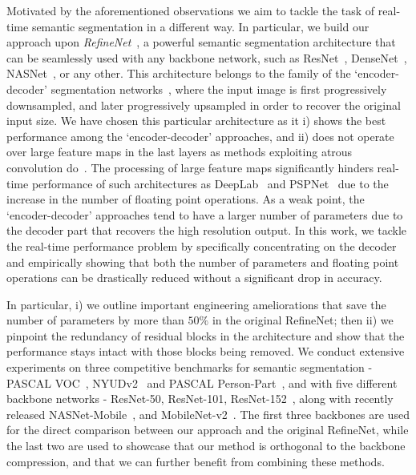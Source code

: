 \documentclass{bmvc2k}
\begin{document}
	Motivated by the aforementioned observations we aim to tackle the task of real-time semantic segmentation in a different way. In particular, we build our approach upon \textit{RefineNet}~\cite{LinMSR17}, a powerful semantic segmentation architecture that can be seamlessly used with any backbone network, such as ResNet~\cite{HeZRS16}, DenseNet~\cite{HuangLMW17}, NASNet~\cite{ZophVSL17}, or any other. This architecture belongs to the family of the `encoder-decoder' segmentation networks~\cite{PaszkeCKC16,BadrinarayananH15,NohHH15}, where the input image is first progressively downsampled, and later progressively upsampled in order to recover the original input size. We have chosen this particular architecture as it i) shows the best performance among the `encoder-decoder' approaches, and ii) does not operate over large feature maps in the last layers as methods exploiting atrous convolution do~\cite{ChenPKMY14,ChenPK0Y16,ChenPSA17,ZhaoSQWJ17,YuKF17}. The processing of large feature maps significantly hinders real-time performance of such architectures as DeepLab~\cite{ChenPKMY14,ChenPK0Y16,ChenPSA17} and PSPNet~\cite{ZhaoSQWJ17} due to the increase in the number of floating point operations. As a weak point, the `encoder-decoder' approaches tend to have a larger number of parameters due to the decoder part that recovers the high resolution output. In this work, we tackle the real-time performance problem by specifically concentrating on the decoder and empirically showing that both the number of parameters and floating point operations can be drastically reduced without a significant drop in accuracy.
	
	In particular, i) we outline important engineering ameliorations that save the number of parameters by more than $50\%$ in the original RefineNet; then ii) we pinpoint the redundancy of residual blocks in the architecture and show that the performance stays intact with those blocks being removed. We conduct extensive experiments on three competitive benchmarks for semantic segmentation - PASCAL VOC~\cite{EveringhamGWWZ10}, NYUDv2~\cite{SilbermanHKF12} and PASCAL Person-Part~\cite{ChenMLFUY14,ChenYWXY16}, and with five different backbone networks - ResNet-50, ResNet-101, ResNet-152~\cite{HeZRS16}, along with recently released NASNet-Mobile~\cite{ZophVSL17}, and MobileNet-v2~\cite{abs-1801-04381}. The first three backbones are used for the direct comparison between our approach and the original RefineNet, while the last two are used to showcase that our method is orthogonal to the backbone compression, and that we can further benefit from combining these methods.
	
\end{document}

